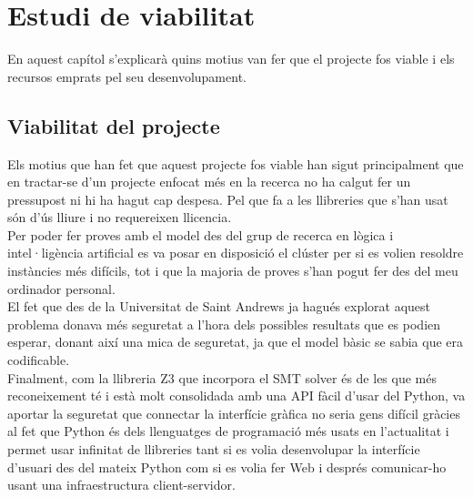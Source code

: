 


\chapter{Estudi de viabilitat} %

\label{Estudi de viabilitat} %
En aquest capítol s'explicarà quins motius van fer que el projecte fos viable i els recursos emprats pel seu desenvolupament.
\section{Viabilitat del projecte}
Els motius que han fet que aquest projecte fos viable han sigut principalment que en tractar-se d'un projecte enfocat més en la recerca no ha calgut fer un pressupost ni hi ha hagut cap despesa. Pel que fa a les llibreries que s'han usat són d'ús lliure i no requereixen llicencia.\\

Per poder fer proves amb el model des del grup de recerca en lògica i intel·ligència artificial es va posar en disposició el clúster per si es volien resoldre instàncies més difícils, tot i que la majoria de proves s'han pogut fer des del meu ordinador personal.\\

El fet que des de la Universitat de Saint Andrews ja hagués explorat aquest problema donava més seguretat a l'hora dels possibles resultats que es podien esperar, donant així una mica de seguretat, ja que el model bàsic se sabia que era codificable. \\

Finalment, com la llibreria Z3 que incorpora el SMT solver és de les que més reconeixement té i està molt consolidada amb una API fàcil d'usar del Python, va aportar la seguretat que connectar la interfície gràfica no seria gens difícil gràcies al fet que Python és dels llenguatges de programació més usats en l'actualitat i permet usar infinitat de llibreries tant si es volia desenvolupar la interfície d'usuari des del mateix Python com si es volia fer Web i després comunicar-ho usant una infraestructura client-servidor.\\

